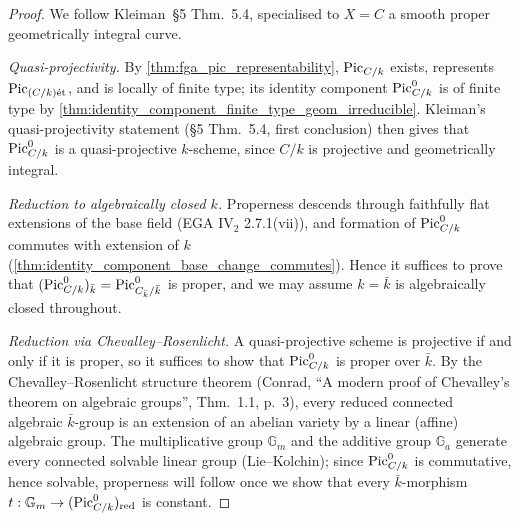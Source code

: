 \begin{proof}
  We follow Kleiman~\S 5 Thm.~5.4, specialised to \(X = C\) a
  smooth proper geometrically integral curve.

  \emph{Quasi-projectivity.} By
  \cref{thm:fga_pic_representability}, \(\operatorname{Pic}_{C/k}\) exists,
  represents \(\operatorname{Pic}_{(C/k)\mathrm{\acute{e}t}}\), and is locally of finite type; its
  identity component \(\operatorname{Pic}^0_{C/k}\) is of finite type by
  \cref{thm:identity_component_finite_type_geom_irreducible}.
  Kleiman's quasi-projectivity statement
  (\S 5 Thm.~5.4, first conclusion) then gives that
  \(\operatorname{Pic}^0_{C/k}\) is a quasi-projective \(k\)-scheme, since \(C/k\)
  is projective and geometrically integral.

  \emph{Reduction to algebraically closed \(k\).} Properness descends
  through faithfully flat extensions of the base field
  (EGA IV\(_2\) 2.7.1(vii)), and formation of \(\operatorname{Pic}^0_{C/k}\)
  commutes with extension of \(k\)
  (\cref{thm:identity_component_base_change_commutes}). Hence it
  suffices to prove that \((\operatorname{Pic}^0_{C/k})_{\bar k} =
  \operatorname{Pic}^0_{C_{\bar k}/\bar k}\) is proper, and we may assume
  \(k = \bar k\) is algebraically closed throughout.

  \emph{Reduction via Chevalley--Rosenlicht.} A quasi-projective
  scheme is projective if and only if it is proper, so it suffices to
  show that \(\operatorname{Pic}^0_{C/k}\) is proper over \(\bar k\). By the
  Chevalley--Rosenlicht structure theorem (Conrad, ``A modern proof of
  Chevalley's theorem on algebraic groups'', Thm.~1.1, p.~3), every
  reduced connected algebraic \(\bar k\)-group is an extension of an
  abelian variety by a linear (affine) algebraic group. The
  multiplicative group \(\mathbb{G}_m\) and the additive group
  \(\mathbb{G}_a\) generate every connected solvable linear group
  (Lie--Kolchin); since \(\operatorname{Pic}^0_{C/k}\) is commutative, hence
  solvable, properness will follow once we show that every
  \(\bar k\)-morphism \(t : \mathbb{G}_m \to (\operatorname{Pic}^0_{C/k})_{\mathrm{red}}\)
  is constant.


\end{proof}
